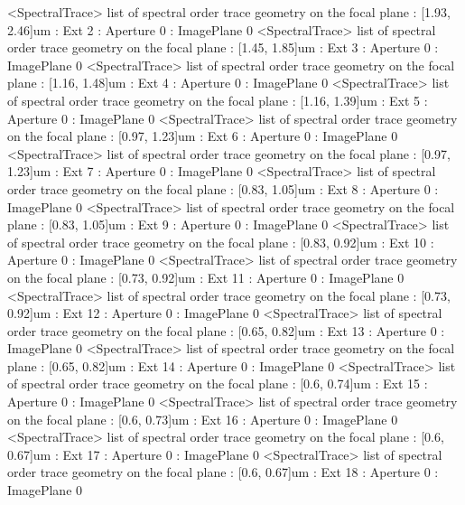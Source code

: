 <SpectralTrace> \textquotedbl{}list of spectral order trace geometry on the focal plane\textquotedbl{} : {[}1.93, 2.46{]}um : Ext 2 : Aperture 0 : ImagePlane 0
<SpectralTrace> \textquotedbl{}list of spectral order trace geometry on the focal plane\textquotedbl{} : {[}1.45, 1.85{]}um : Ext 3 : Aperture 0 : ImagePlane 0
<SpectralTrace> \textquotedbl{}list of spectral order trace geometry on the focal plane\textquotedbl{} : {[}1.16, 1.48{]}um : Ext 4 : Aperture 0 : ImagePlane 0
<SpectralTrace> \textquotedbl{}list of spectral order trace geometry on the focal plane\textquotedbl{} : {[}1.16, 1.39{]}um : Ext 5 : Aperture 0 : ImagePlane 0
<SpectralTrace> \textquotedbl{}list of spectral order trace geometry on the focal plane\textquotedbl{} : {[}0.97, 1.23{]}um : Ext 6 : Aperture 0 : ImagePlane 0
<SpectralTrace> \textquotedbl{}list of spectral order trace geometry on the focal plane\textquotedbl{} : {[}0.97, 1.23{]}um : Ext 7 : Aperture 0 : ImagePlane 0
<SpectralTrace> \textquotedbl{}list of spectral order trace geometry on the focal plane\textquotedbl{} : {[}0.83, 1.05{]}um : Ext 8 : Aperture 0 : ImagePlane 0
<SpectralTrace> \textquotedbl{}list of spectral order trace geometry on the focal plane\textquotedbl{} : {[}0.83, 1.05{]}um : Ext 9 : Aperture 0 : ImagePlane 0
<SpectralTrace> \textquotedbl{}list of spectral order trace geometry on the focal plane\textquotedbl{} : {[}0.83, 0.92{]}um : Ext 10 : Aperture 0 : ImagePlane 0
<SpectralTrace> \textquotedbl{}list of spectral order trace geometry on the focal plane\textquotedbl{} : {[}0.73, 0.92{]}um : Ext 11 : Aperture 0 : ImagePlane 0
<SpectralTrace> \textquotedbl{}list of spectral order trace geometry on the focal plane\textquotedbl{} : {[}0.73, 0.92{]}um : Ext 12 : Aperture 0 : ImagePlane 0
<SpectralTrace> \textquotedbl{}list of spectral order trace geometry on the focal plane\textquotedbl{} : {[}0.65, 0.82{]}um : Ext 13 : Aperture 0 : ImagePlane 0
<SpectralTrace> \textquotedbl{}list of spectral order trace geometry on the focal plane\textquotedbl{} : {[}0.65, 0.82{]}um : Ext 14 : Aperture 0 : ImagePlane 0
<SpectralTrace> \textquotedbl{}list of spectral order trace geometry on the focal plane\textquotedbl{} : {[}0.6, 0.74{]}um : Ext 15 : Aperture 0 : ImagePlane 0
<SpectralTrace> \textquotedbl{}list of spectral order trace geometry on the focal plane\textquotedbl{} : {[}0.6, 0.73{]}um : Ext 16 : Aperture 0 : ImagePlane 0
<SpectralTrace> \textquotedbl{}list of spectral order trace geometry on the focal plane\textquotedbl{} : {[}0.6, 0.67{]}um : Ext 17 : Aperture 0 : ImagePlane 0
<SpectralTrace> \textquotedbl{}list of spectral order trace geometry on the focal plane\textquotedbl{} : {[}0.6, 0.67{]}um : Ext 18 : Aperture 0 : ImagePlane 0
